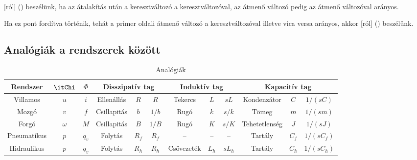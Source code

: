 \documentclass[../main.tex]{subfiles}
\begin{document}
[ról] () beszélünk, ha az átalakítás után a keresztváltozó
a keresztváltozóval, az átmenő változó pedig az átmenő változóval arányos.

Ha ez pont fordítva történik, tehát a primer oldali átmenő változó a keresztváltozóval
illetve vica versa arányos, akkor [ról] () beszélünk.

\subsection{Analógiák a rendszerek között}

\bgroup
\def\arraystretch{1.2}
\begin{table}[H]
  \centering
  \begin{adjustbox}{angle=90}
    \begin{tabular}{| c | c | c || c | c | c || c | c |c	|| c | c | c |}
      \hline
      Rendszer                              & $\itChi$ & $\varPhi$  &
      \multicolumn{3}{c||}{Disszipatív tag} &
      \multicolumn{3}{c||}{Induktív tag}    &
      \multicolumn{3}{c|}{Kapacitív tag}
      \\ \hline \hline
      Villamos                              & $u$      & $i$        &
      Ellenállás                            & $R$      & $R$        &
      Tekercs                               & $L$      & $sL$       &
      Kondenzátor                           & $C$      & $1/(sC)$
      \\ \hline
      Mozgó                                 & $v$      & $f$        &
      Csillapitás                           & $b$      & $1/b$      &
      Rugó                                  & $k$      & $s/k$      &
      Tömeg                                 & $m$      & $1/(sm)$
      \\ \hline
      Forgó                                 & $\omega$ & $M$        &
      Csillapitás                           & $B$      & $1/B$      &
      Rugó                                  & $K$      & $s/K$      &
      Tehetetlenség                         & $J$      & $1/(sJ)$
      \\ \hline
      Pneumatikus                           & $p$      & $q_v$      &
      Folytás                               & $R_f$    & $R_f$      &
      --                                    & --       & --         &
      Tartály                               & $C_f$    & $1/(sC_f)$
      \\ \hline
      Hidraulikus                           & $p$      & $q_v$      &
      Folytás                               & $R_h$    & $R_h$      &
      Csővezeték                            & $L_h$    & $sL_h$     &
      Tartály                               & $C_h$    & $1/(sC_h)$
      \\ \hline
    \end{tabular}
  \end{adjustbox}
  \caption{Analógiák}
  \label{fig:analogies}
\end{table}
\egroup
\end{document}
